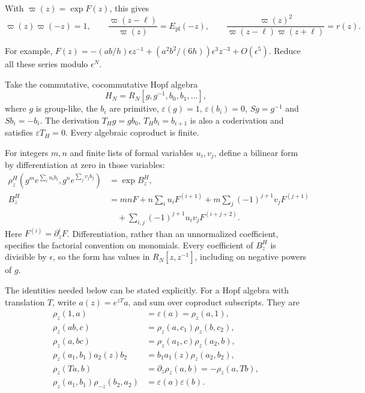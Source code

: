 With $\varpi(z)=\exp F(z)$, this gives
\begin{equation}\label{v4-arith:curve:eq:varpi}
 \varpi(z)\varpi(-z)=1,\qquad
 \frac{\varpi(z-\ell)}{\varpi(z)}=E_{\mathrm{pl}}(-z),\qquad
 \frac{\varpi(z)^2}{\varpi(z-\ell)\varpi(z+\ell)}=r(z).
\end{equation}

For example,
$F(z)=-(ab/h)\epsilon z^{-1}
 +(a^2b^2/(6h))\epsilon^3z^{-3}+O(\epsilon^5)$.
Reduce all these series modulo $\epsilon^N$.

Take the commutative, cocommutative Hopf algebra
\[
 H_N=R_N[g,g^{-1},b_0,b_1,\ldots],
\]
where $g$ is group-like, the $b_i$ are primitive,
$\varepsilon(g)=1$, $\varepsilon(b_i)=0$,
$Sg=g^{-1}$ and $Sb_i=-b_i$.
The derivation $T_Hg=gb_0$, $T_Hb_i=b_{i+1}$ is also a
coderivation and satisfies $\varepsilon T_H=0$.
Every algebraic coproduct is finite.

For integers $m,n$ and finite lists of formal variables $u_i,v_j$,
define a bilinear form by differentiation at zero in those
variables:
\begin{align*}
 \rho^H_z\left(g^me^{\sum_i u_ib_i},g^ne^{\sum_jv_jb_j}\right)
 &=\exp B^H_z,\\
 B^H_z&=mnF+n\sum_i u_iF^{(i+1)}
       +m\sum_j(-1)^{j+1}v_jF^{(j+1)}\\
 &\quad+\sum_{i,j}(-1)^{j+1}u_iv_jF^{(i+j+2)} .
\end{align*}
Here $F^{(i)}=\partial_z^iF$.
Differentiation, rather than an unnormalized coefficient,
specifies the factorial convention on monomials.
Every coefficient of $B^H_z$ is divisible by $\epsilon$,
so the form has values in $R_N[z,z^{-1}]$, including on
negative powers of $g$.

The identities needed below can be stated explicitly.
For a Hopf algebra with translation $T$, write
$a(z)=e^{zT}a$, and sum over coproduct subscripts. They are
\begin{equation}\label{v4-arith:curve:eq:six-identities}
 \begin{aligned}
 \rho_z(1,a)&=\varepsilon(a)=\rho_z(a,1),\\
 \rho_z(ab,c)&=\rho_z(a,c_1)\rho_z(b,c_2),\\
 \rho_z(a,bc)&=\rho_z(a_1,c)\rho_z(a_2,b),\\
 \rho_z(a_1,b_1)a_2(z)b_2&=b_1a_1(z)\rho_z(a_2,b_2),\\
 \rho_z(Ta,b)&=\partial_z\rho_z(a,b)=-\rho_z(a,Tb),\\
 \rho_z(a_1,b_1)\rho_{-z}(b_2,a_2)&=\varepsilon(a)\varepsilon(b).
 \end{aligned}
\end{equation}

